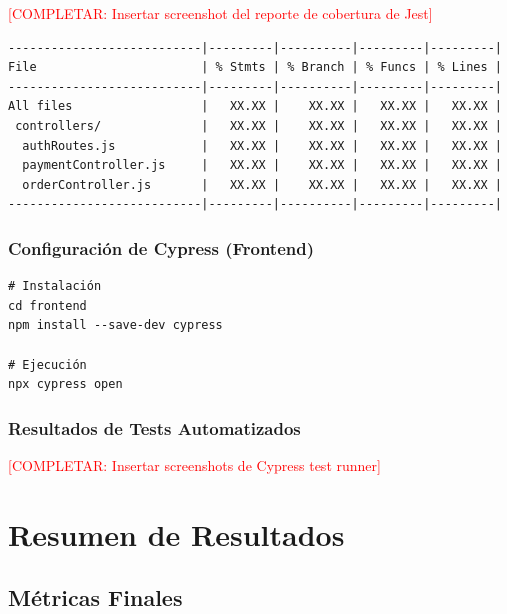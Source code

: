 \documentclass[12pt,a4paper]{article}
\begin{document}
\textcolor{red}{[COMPLETAR: Insertar screenshot del reporte de cobertura de Jest]}

\begin{verbatim}
---------------------------|---------|----------|---------|---------|
File                       | % Stmts | % Branch | % Funcs | % Lines |
---------------------------|---------|----------|---------|---------|
All files                  |   XX.XX |    XX.XX |   XX.XX |   XX.XX |
 controllers/              |   XX.XX |    XX.XX |   XX.XX |   XX.XX |
  authRoutes.js            |   XX.XX |    XX.XX |   XX.XX |   XX.XX |
  paymentController.js     |   XX.XX |    XX.XX |   XX.XX |   XX.XX |
  orderController.js       |   XX.XX |    XX.XX |   XX.XX |   XX.XX |
---------------------------|---------|----------|---------|---------|
\end{verbatim}

\subsubsection{Configuración de Cypress (Frontend)}

\begin{verbatim}
# Instalación
cd frontend
npm install --save-dev cypress

# Ejecución
npx cypress open
\end{verbatim}

\subsubsection{Resultados de Tests Automatizados}

\textcolor{red}{[COMPLETAR: Insertar screenshots de Cypress test runner]}

\section{Resumen de Resultados}

\subsection{Métricas Finales}
\end{document}
